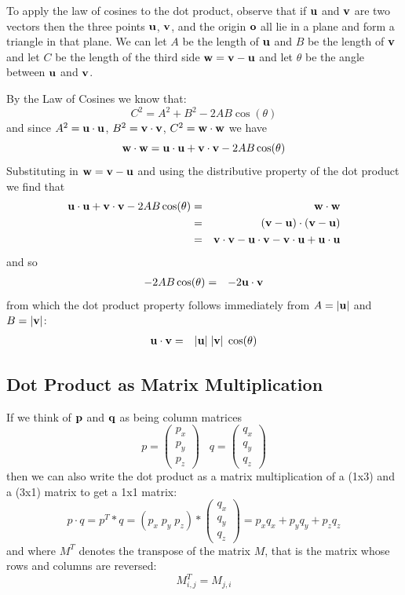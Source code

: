 \documentclass{book}
\newcommand{\vect}[1]{{\bf{ #1}}}
\begin{document}
To apply the law of cosines to the dot product, observe that if  $\vect {u} $ and $\vect{v}$
are two vectors then the three points $\vect{u}$, $\vect{v}$, and the origin $\vect{o}$ all
lie in a plane and form a triangle in that plane. We can let $A$ be the length of $\vect{u}$ and
$B$ be the length of $\vect{v}$  and let $C$ be the length of the third side $\vect{w}=\vect{v}-\vect{u}$
and let $\theta$ be the angle between $\vect{u}$ and $\vect{v}$.

By the Law of Cosines we know that:
\[
C^2 = A^2 + B^2 - 2AB \cos(\theta)
\]
and since $A^2=\vect{u}\cdot\vect{u}$, $B^2=\vect{v}\cdot \vect{v}$, $C^2=\vect{w}\cdot \vect{w}$ we have
\[
\vect{w}\cdot\vect{w} = \vect{u} \cdot \vect{u} + \vect{v} \cdot \vect{v} - 2 A B \cos(\theta)
\]
Substituting in $\vect{w} = \vect{v} - \vect{u}$  and using the distributive property of the dot product
we find that
\begin{eqnarray*}
\vect{u} \cdot \vect{u} + \vect{v} \cdot \vect{v} - 2 A B \cos(\theta) &=&
\vect{w}\cdot\vect{w}  \\
&=&  (\vect{v} - \vect{u}) \cdot (\vect{v} - \vect{u}) \\
&=&  \vect{v}\cdot \vect{v} -  \vect{u}\cdot \vect{v} -  \vect{v}\cdot \vect{u}  + \vect{u}\cdot \vect{u}
\end{eqnarray*}
and so
\begin{eqnarray*}
 - 2 A B \cos(\theta) &=&
 - 2 \vect{u}\cdot \vect{v} \\
\end{eqnarray*}
from which the dot product property follows immediately from $A = \vert \vect{u}\vert$ and
$B = \vert \vect{v}\vert$:
\begin{eqnarray*}
 \vect{u}\cdot \vect{v} &=&  \vert \vect{u}\vert\; \vert \vect{v} \vert \; \cos(\theta)
\end{eqnarray*}

\subsection{Dot Product as Matrix Multiplication}
If we think of $\vect p$ and $\vect q$ as being column matrices
\[
p = \left (\begin{array}{c} p_x \\ p_y \\ p_z \end{array} \right )
\;\;\;
q = \left (\begin{array}{c} q_x \\ q_y \\ q_z \end{array} \right )
\]
then we can also write the dot product as a matrix multiplication of a (1x3) and a (3x1) matrix
to get a 1x1 matrix:
\[
p\cdot q = p^T*q = (p_x\; p_y \;p_z)*
\left (\begin{array}{c} q_x \\ q_y \\ q_z \end{array} \right )
=p_xq_x + p_yq_y + p_zq_z
\]
and where $M^T$ denotes the transpose of the matrix $M$, that is the matrix
whose rows and columns are reversed:
\[
M^T_{i,j} = M_{j,i}
\]
\end{document}
